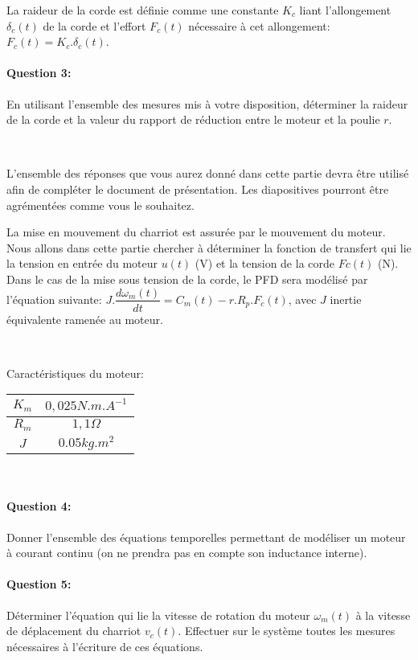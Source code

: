La raideur de la corde est définie comme une constante $K_c$ liant l'allongement $\delta_c(t)$ de la corde et l'effort $F_c(t)$ nécessaire à cet allongement: $F_c(t)=K_c.\delta_c(t)$.

\paragraph{Question 3:} En utilisant l'ensemble des mesures mis à votre disposition, déterminer la raideur de la corde et la valeur du rapport de réduction entre le moteur et la poulie $r$.

~\

L'ensemble des réponses que vous aurez donné dans cette partie devra être utilisé afin de compléter le document de présentation. Les diapositives pourront être agrémentées comme vous le souhaitez.

\ifdef{\public}{\cleardoublepage}{\newpage}


La mise en mouvement du charriot est assurée par le mouvement du moteur. Nous allons dans cette partie chercher à déterminer la fonction de transfert qui lie la tension en entrée du moteur $u(t)$ (V) et la tension de la corde $Fc(t)$ (N). Dans le cas de la mise sous tension de la corde, le PFD sera modélisé par l'équation suivante: $J.\dfrac{d \omega_m(t)}{dt}=C_m(t)-r.R_p.F_c(t)$, avec $J$ inertie équivalente ramenée au moteur.

~\

Caractéristiques du moteur:
\begin{tabular}{|c|c|}
\hline
$K_m$ & $0,025N.m.A^{-1}$ \\
\hline
$R_m$ & $1,1\Omega$ \\
\hline
$J$ & $0.05kg.m^2$ \\
\hline
\end{tabular}

~\

\paragraph{Question 4:} Donner l'ensemble des équations temporelles permettant de modéliser un moteur à courant continu (on ne prendra pas en compte son inductance interne).

\paragraph{Question 5:} Déterminer l'équation qui lie la vitesse de rotation du moteur $\omega_m(t)$ à la vitesse de déplacement du charriot $v_c(t)$. Effectuer sur le système toutes les mesures nécessaires à l'écriture de ces équations.

